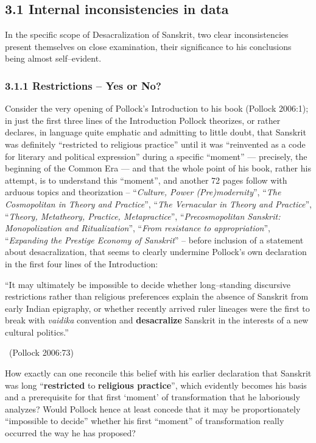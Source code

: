 \subsection*{3.1 Internal inconsistencies in data}

In the specific scope of Desacralization of Sanskrit, two clear inconsistencies present themselves on close examination, their significance to his conclusions being almost self–evident.

\subsubsection*{3.1.1 Restrictions – Yes or No?}

Consider the very opening of Pollock’s Introduction to his book (Pollock 2006:1); in just the first three lines of the Introduction Pollock theorizes, or rather declares, in language quite emphatic and admitting to little doubt, that Sanskrit was definitely “restricted to religious practice” until it was “reinvented as a code for literary and political expression” during a specific “moment” — precisely, the beginning of the Common Era — and that the whole point of his book, rather his attempt, is to understand this “moment”, and another 72 pages follow with arduous topics and theorization – “\textit{Culture, Power (Pre)modernity}”, “\textit{The Cosmopolitan in Theory and Practice}”, “\textit{The Vernacular in Theory and Practice}”, “\textit{Theory, Metatheory, Practice, Metapractice}”, “\textit{Precosmopolitan Sanskrit: Monopolization and Ritualization}”, “\textit{From resistance to appropriation}”, “\textit{Expanding the Prestige Economy of Sanskrit}” – before inclusion of a statement about desacralization, that seems to clearly undermine Pollock’s own declaration in the first four lines of the Introduction:

\begin{myquote}
“It may ultimately be impossible to decide whether long–standing discursive restrictions rather than religious preferences explain the absence of Sanskrit from early Indian epigraphy, or whether recently arrived ruler lineages were the first to break with \textit{vaidika} convention and \textbf{desacralize} Sanskrit in the interests of a new cultural politics.” 

~\hfill (Pollock 2006:73)
\end{myquote}

How exactly can one reconcile this belief with his earlier declaration that Sanskrit was long “\textbf{restricted} to \textbf{religious practice}”, which evidently becomes his basis and a prerequisite for that first ‘moment’ of transformation that he laboriously analyzes? Would Pollock hence at least concede that it may be proportionately “impossible to decide” whether his first “moment” of transformation really occurred the way he has proposed?



